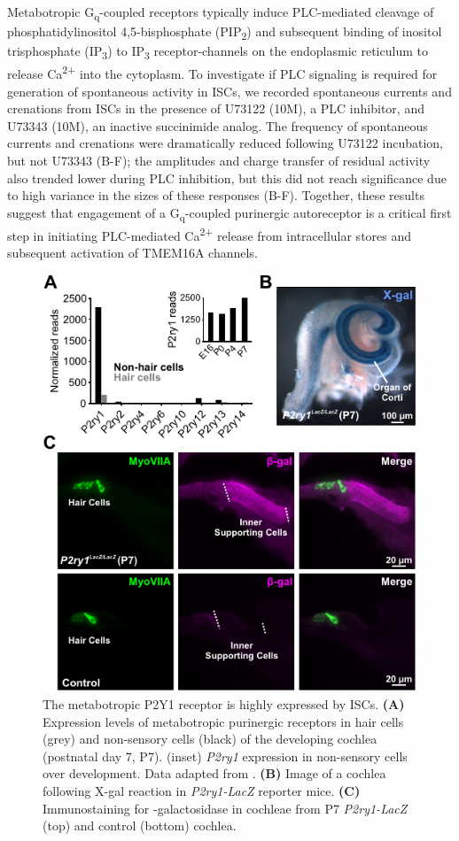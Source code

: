 \documentclass[9pt,lineno]{elife}
\begin{document}
Metabotropic G\textsubscript{q}-coupled receptors typically induce PLC-mediated cleavage of phosphatidylinositol 4,5-bisphosphate (PIP\textsubscript{2}) and subsequent binding of inositol trisphosphate (IP\textsubscript{3}) to IP\textsubscript{3} receptor-channels on the endoplasmic reticulum to release Ca\textsuperscript{2+} into the cytoplasm. To investigate if PLC signaling is required for generation of spontaneous activity in ISCs, we recorded spontaneous currents and crenations from ISCs in the presence of U73122 (10\textmu M), a PLC inhibitor, and U73343 (10\textmu M), an inactive succinimide analog. The frequency of spontaneous currents and crenations were dramatically reduced following U73122 incubation, but not U73343 (B-F); the amplitudes and charge transfer of residual activity also trended lower during PLC inhibition, but this did not reach significance due to high variance in the sizes of these responses (B-F). Together, these results suggest that engagement of a G\textsubscript{q}-coupled purinergic autoreceptor is a critical first step in initiating PLC-mediated Ca\textsuperscript{2+} release from intracellular stores and subsequent activation of TMEM16A channels.

\begin{figure}
\includegraphics[width=.63\linewidth]{figures/Fig2.pdf}
\caption{The metabotropic P2Y1 receptor is highly expressed by ISCs.
\textbf{(A)} Expression levels of metabotropic purinergic receptors in hair cells (grey) and non-sensory cells (black) of the developing cochlea (postnatal day 7, P7). (inset) \textit{P2ry1} expression in non-sensory cells over development. Data adapted from \cite{Scheffer2015}.
\textbf{(B)} Image of a cochlea following X-gal reaction in \textit{P2ry1-LacZ} reporter mice.
\textbf{(C)} Immunostaining for \textbeta-galactosidase in cochleae from P7 \textit{P2ry1-LacZ} (top) and control (bottom) cochlea.
}
\label{fig:f2}
\end{figure}
\end{document}
